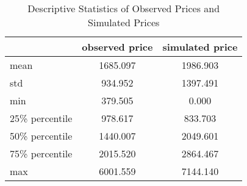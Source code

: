 \begin{table}[H]
    \centering
    \caption{Descriptive Statistics of Observed Prices and Simulated Prices}
    \label{table: fit_of_model}
    \begin{tabular}{lcc}
        \toprule
                        & observed price & simulated price \\
        \midrule
        mean            & 1685.097       & 1986.903        \\
        std             & 934.952        & 1397.491        \\
        min             & 379.505        & 0.000           \\
        25\% percentile & 978.617        & 833.703         \\
        50\% percentile & 1440.007       & 2049.601        \\
        75\% percentile & 2015.520       & 2864.467        \\
        max             & 6001.559       & 7144.140        \\
        \bottomrule
    \end{tabular}
\end{table}
